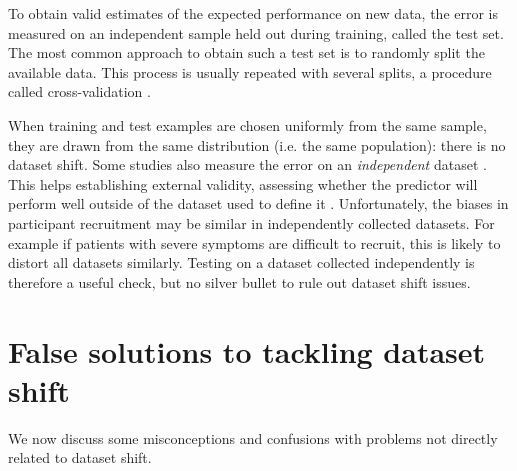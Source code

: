 \documentclass[a4paper,num-refs]{oup-contemporary}
\begin{document}
To obtain valid estimates of the expected performance on new data, the
error is measured on an independent sample held out during training, called the
test set.
%
The most common approach to obtain such a test set is to randomly split the
available data.
%
This process is usually repeated with several splits, a procedure called
cross-validation \citep[Sec. 7]{arlot2010survey,friedman2001elements}.
%

When training and test examples are chosen uniformly from the same sample, they
are drawn from the same distribution (i.e. the same population): there is no
dataset shift.
%
Some studies also measure the error on an \emph{independent} dataset
\citep[e.g.][]{beck2011systematic,jin2020generalizable}. This helps
establishing external validity, assessing
whether the predictor will perform well outside of the dataset used to
define it \citep{bleeker2003external}.
%
Unfortunately, the biases in participant recruitment may be similar
in independently collected datasets. For example if patients with severe
symptoms are difficult to recruit, this is likely to distort all datasets
similarly. Testing on a dataset collected independently is therefore a useful
check, but no silver bullet to rule out dataset shift issues.

\section{False solutions to tackling dataset shift}\label{sec:misconceptions}

We now discuss some misconceptions and
confusions with problems not directly related to dataset shift.
\end{document}
